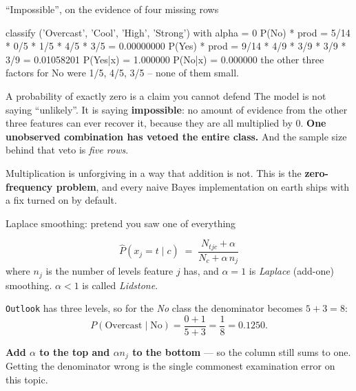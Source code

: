 \documentclass[aspectratio=169]{beamer}
\begin{document}
\begin{frame}[fragile,shrink=6]{``Impossible'', on the evidence of four
missing rows}
\begin{outblk}
classify ('Overcast', 'Cool', 'High', 'Strong') with alpha = 0
      P(No) * prod = 5/14 * 0/5 * 1/5 * 4/5 * 3/5 = 0.00000000
      P(Yes) * prod = 9/14 * 4/9 * 3/9 * 3/9 * 3/9 = 0.01058201
      P(Yes|x) = 1.000000   P(No|x) = 0.000000
      the other three factors for No were 1/5, 4/5, 3/5 -- none of them small.
\end{outblk}
\begin{alertblock}{A probability of exactly zero is a claim you cannot
defend}
  \footnotesize The model is not saying ``unlikely''. It is saying
  \textbf{impossible}: no amount of evidence from the other three features
  can ever recover it, because they are all multiplied by $0$. \textbf{One
  unobserved combination has vetoed the entire class.} And the sample size
  behind that veto is \emph{five rows}.
\end{alertblock}
\begin{center}\small
  Multiplication is unforgiving in a way that addition is not. This is the
  \textbf{zero-frequency problem}, and every naive Bayes implementation on
  earth ships with a fix turned on by default.
\end{center}
\end{frame}

\begin{frame}[shrink=6]{Laplace smoothing: pretend you saw one of everything}
  \begin{exampleblock}{}
    \centering
    \[
      \hat{P}(x_j = t \mid c) \;=\; \frac{N_{tjc} + \alpha}
        {N_c + \alpha\,n_j}
    \]
    \small where $n_j$ is the number of levels feature $j$ has, and
    $\alpha = 1$ is \emph{Laplace} (add-one) smoothing. $\alpha < 1$ is called
    \emph{Lidstone}.
  \end{exampleblock}
  \begin{center}\small
    \texttt{Outlook} has three levels, so for the \emph{No} class the
    denominator becomes $5 + 3 = 8$:
    \[
      P(\text{Overcast} \mid \text{No}) = \frac{0+1}{5+3}
        = \frac{1}{8} = 0.1250 .
    \]
  \end{center}
  \begin{center}\small
    \textbf{Add $\alpha$ to the top and $\alpha n_j$ to the bottom} --- so
    the column still sums to one. Getting the denominator wrong is the
    single commonest examination error on this topic.
  \end{center}
\end{frame}
\end{document}
